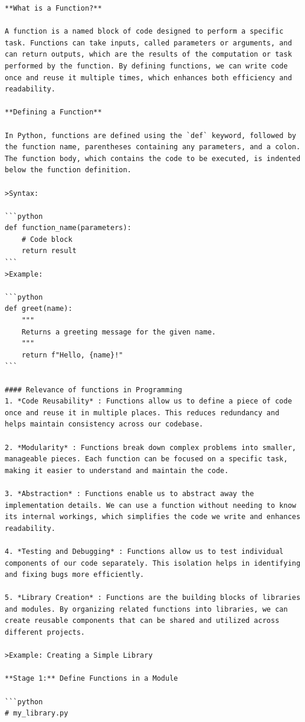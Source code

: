 \documentclass[
  letterpaper,
  DIV=11,
  numbers=noendperiod]{scrreprt}
\theoremstyle{plain}
\theoremstyle{definition}
\theoremstyle{remark}
\begin{document}
\begin{verbatim}
**What is a Function?**

A function is a named block of code designed to perform a specific task. Functions can take inputs, called parameters or arguments, and can return outputs, which are the results of the computation or task performed by the function. By defining functions, we can write code once and reuse it multiple times, which enhances both efficiency and readability.

**Defining a Function**

In Python, functions are defined using the `def` keyword, followed by the function name, parentheses containing any parameters, and a colon. The function body, which contains the code to be executed, is indented below the function definition.

>Syntax:

```python
def function_name(parameters):
    # Code block
    return result
```
>Example:

```python
def greet(name):
    """
    Returns a greeting message for the given name.
    """
    return f"Hello, {name}!"
```

#### Relevance of functions in Programming
1. *Code Reusability* : Functions allow us to define a piece of code once and reuse it in multiple places. This reduces redundancy and helps maintain consistency across our codebase.

2. *Modularity* : Functions break down complex problems into smaller, manageable pieces. Each function can be focused on a specific task, making it easier to understand and maintain the code.

3. *Abstraction* : Functions enable us to abstract away the implementation details. We can use a function without needing to know its internal workings, which simplifies the code we write and enhances readability.

4. *Testing and Debugging* : Functions allow us to test individual components of our code separately. This isolation helps in identifying and fixing bugs more efficiently.

5. *Library Creation* : Functions are the building blocks of libraries and modules. By organizing related functions into libraries, we can create reusable components that can be shared and utilized across different projects.

>Example: Creating a Simple Library

**Stage 1:** Define Functions in a Module

```python
# my_library.py


\end{verbatim}
\end{document}
